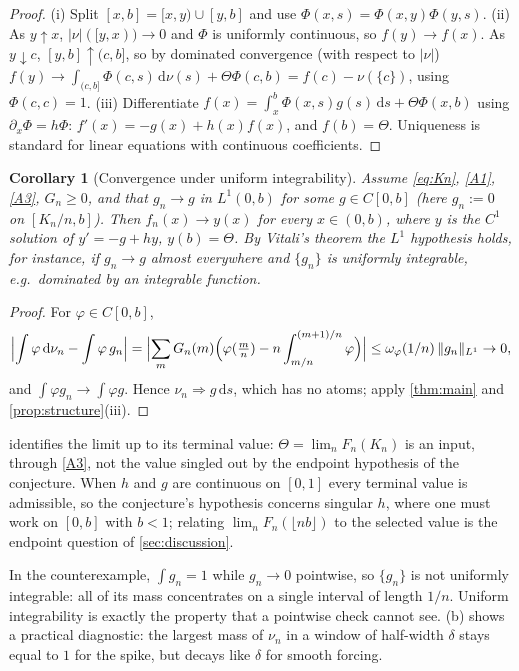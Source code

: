 \documentclass[11pt]{article}
\newtheorem{corollary}[theorem]{Corollary}
\theoremstyle{definition}
\theoremstyle{remark}
\newcommand{\dd}{\,\mathrm{d}}
\newcommand{\1}{\mathbf{1}}
\newcommand{\fl}[1]{\lfloor #1\rfloor}
\newcommand{\weak}{\Rightarrow}
\begin{document}
\begin{proof}
(i) Split $[x,b]=[x,y)\cup[y,b]$ and use $\Phi(x,s)=\Phi(x,y)\Phi(y,s)$.
(ii) As $y\uparrow x$, $|\nu|([y,x))\to0$ and $\Phi$ is uniformly continuous, so $f(y)\to f(x)$.
As $y\downarrow c$, $[y,b]\uparrow(c,b]$, so by dominated convergence (with respect to $|\nu|$)
$f(y)\to\int_{(c,b]}\Phi(c,s)\dd\nu(s)+\Theta\Phi(c,b)=f(c)-\nu(\{c\})$, using $\Phi(c,c)=1$.
(iii) Differentiate
$f(x)=\int_x^b\Phi(x,s)g(s)\dd s+\Theta\Phi(x,b)$ using $\partial_x\Phi=h\Phi$:
$f'(x)=-g(x)+h(x)f(x)$, and $f(b)=\Theta$. Uniqueness is standard for linear equations with
continuous coefficients.
\end{proof}

\begin{corollary}[Convergence under uniform integrability]\label{cor:ui}
Assume \eqref{eq:Kn}, \ref{A1}, \ref{A3}, $G_n\ge0$, and that $g_n\to g$ in $L^1(0,b)$ for some
$g\in C[0,b]$ (here $g_n:=0$ on $[K_n/n,b]$). Then $f_n(x)\to y(x)$ for \emph{every}
$x\in(0,b)$, where $y$ is the $C^1$ solution of $y'=-g+hy$, $y(b)=\Theta$. By Vitali's theorem
the $L^1$ hypothesis holds, for instance, if $g_n\to g$ almost everywhere and $\{g_n\}$ is
uniformly integrable, e.g.\ dominated by an integrable function.
\end{corollary}

\begin{proof}
For $\varphi\in C[0,b]$,
\[
\Bigl|\int\varphi\dd\nu_n-\int\varphi\, g_n\Bigr|
=\Bigl|\sum_mG_n(m)\Bigl(\varphi(\tfrac mn)-n\int_{m/n}^{(m+1)/n}\varphi\Bigr)\Bigr|
\le\omega_\varphi(1/n)\,\|g_n\|_{L^1}\to0,
\]
and $\int\varphi g_n\to\int\varphi g$. Hence $\nu_n\weak g\dd s$, which has no atoms; apply
\cref{thm:main} and \cref{prop:structure}(iii).
\end{proof}

 identifies the limit up to its terminal value: $\Theta=\lim_nF_n(K_n)$ is an input,
through \ref{A3}, not the value singled out by the endpoint hypothesis of the conjecture. When
$h$ and $g$ are continuous on $[0,1]$ every terminal value is admissible, so the conjecture's
hypothesis concerns singular $h$, where one must work on $[0,b]$ with $b<1$; relating
$\lim_nF_n(\fl{nb})$ to the selected value is the endpoint question of \cref{sec:discussion}.

In the counterexample, $\int g_n=1$ while $g_n\to0$ pointwise, so $\{g_n\}$ is not uniformly
integrable: all of its mass concentrates on a single interval of length $1/n$. Uniform
integrability is exactly the property that a pointwise check cannot see.
(b) shows a practical diagnostic: the largest mass of $\nu_n$ in a window of
half-width $\delta$ stays equal to $1$ for the spike, but decays like $\delta$ for smooth forcing.
\end{document}
